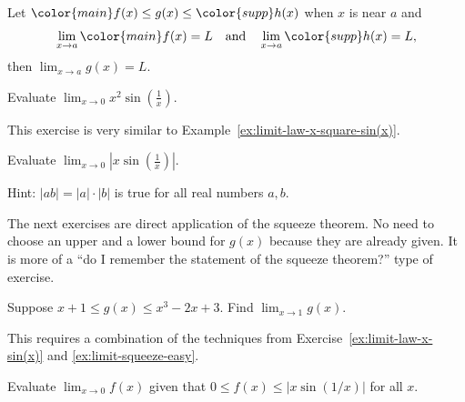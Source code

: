 \documentclass[../main.tex]{subfiles}
\begin{document}
\begin{thm}[Squeeze] \label{thm:limit-squeeze}
  Let {\({\color{main}f(x)} \le g(x) \le {\color{supp}h(x)}\)} when \(x\) is near \(a\) and
  \[
    \lim_{x \to a} {\color{main}f(x)} = L \quad\text{and}\quad \lim_{x \to a} {\color{supp}h(x)} = L,
  \]
  then
  {\(\lim_{x \to a} g(x) = L\).}

\end{thm}


\begin{sidefigure}{%
    }
  \begin{example} \label{ex:limit-law-x-square-sin(x)}
    Evaluate \(\lim_{x \to 0} x^{2} \sin\left(\frac{1}{x}\right)\).

    \blanks*
  \end{example}
\end{sidefigure}
\clearpage

This exercise is very similar to Example~\ref{ex:limit-law-x-square-sin(x)}.

\begin{exercise} \label{ex:limit-law-x-sin(x)}
  Evaluate \(\lim_{x \to 0} \left|x \sin\left(\frac{1}{x}\right)\right|\).

  {\footnotesize Hint: \(|ab| = |a|\cdot|b|\) is true for all real numbers \(a,b\).}

  \blanks*
\end{exercise}

The next exercises are direct application of the squeeze theorem. No need to choose an upper and a lower bound for \(g(x)\) because they are already given.  It is more of a ``do I remember the statement of the squeeze theorem?'' type of exercise.
\begin{exercise} \label{ex:limit-squeeze-easy}
  Suppose \(x+1 \le g(x) \le x^{3} - 2x + 3\). Find \(\lim_{x \to 1} g(x)\).

  \blanks*
\end{exercise}

This requires a combination of the techniques from Exercise~\ref{ex:limit-law-x-sin(x)} and \ref{ex:limit-squeeze-easy}.
\begin{exercise} \label{ex:limit-squeeze-abs-x-sin}
  Evaluate \(\lim_{x \to 0} f(x)\) given that \(0 \le f(x) \le |x \sin(1/x)|\) for all \(x\).

  \blanks*
\end{exercise}
\clearpage
\end{document}
